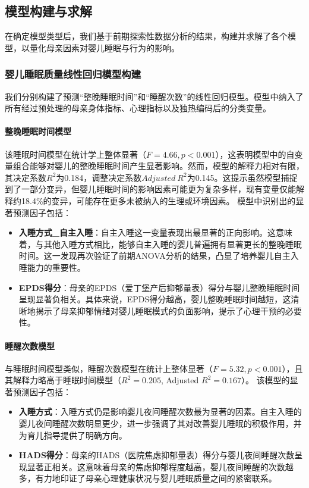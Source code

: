 \documentclass[withoutpreface,bwprint]{cumcmthesis}
\begin{document}
\subsection{模型构建与求解}
在确定模型类型后，我们基于前期探索性数据分析的结果，构建并求解了各个模型，以量化母亲因素对婴儿睡眠与行为的影响。

\subsubsection{婴儿睡眠质量线性回归模型构建}
我们分别构建了预测“整晚睡眠时间”和“睡醒次数”的线性回归模型。模型中纳入了所有经过预处理的母亲身体指标、心理指标以及独热编码后的分类变量。

\paragraph{整晚睡眠时间模型}
该睡眠时间模型在统计学上整体显著（$F=4.66, p < 0.001$），这表明模型中的自变量组合能够对婴儿的整晚睡眠时间产生显著影响。然而，模型的解释力相对有限，其决定系数$R^2$为0.184，调整决定系数$Adjusted~R^2$为0.145。这提示虽然模型捕捉到了一部分变异，但婴儿睡眠时间的影响因素可能更为复杂多样，现有变量仅能解释约18.4\%的变异，可能存在更多未被纳入的生理或环境因素。
模型中识别出的显著预测因子包括：
\begin{itemize}
    \item \textbf{入睡方式\_自主入睡}：自主入睡这一变量表现出最显著的正向影响。这意味着，与其他入睡方式相比，能够自主入睡的婴儿普遍拥有显著更长的整晚睡眠时间。这一发现再次验证了前期ANOVA分析的结果，凸显了培养婴儿自主入睡能力的重要性。
    \item \textbf{EPDS得分}：母亲的EPDS（爱丁堡产后抑郁量表）得分与婴儿整晚睡眠时间呈现显著负相关。具体来说，EPDS得分越高，婴儿整晚睡眠时间越短，这清晰地揭示了母亲抑郁情绪对婴儿睡眠模式的负面影响，提示了心理干预的必要性。
\end{itemize}

\paragraph{睡醒次数模型}
与睡眠时间模型类似，睡醒次数模型在统计上整体显著（$F=5.32, p < 0.001$），且其解释力略高于睡眠时间模型（$R^2 = 0.205$, Adjusted $R^2 = 0.167$）。
该模型的显著预测因子包括：
\begin{itemize}
    \item \textbf{入睡方式}：入睡方式仍是影响婴儿夜间睡醒次数最为显著的因素。自主入睡的婴儿夜间睡醒次数明显更少，进一步强调了其对改善婴儿睡眠的积极作用，并为育儿指导提供了明确方向。
    \item \textbf{HADS得分}：母亲的HADS（医院焦虑抑郁量表）得分与婴儿夜间睡醒次数呈现显著正相关。这意味着母亲的焦虑抑郁程度越高，婴儿夜间睡醒的次数越多，有力地印证了母亲心理健康状况与婴儿睡眠质量之间的紧密联系。
\end{itemize}
\end{document}
